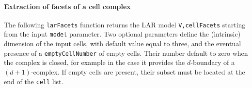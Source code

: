 \documentclass[11pt,oneside]{article}    %
\begin{document}
\paragraph{Extraction of facets of a cell complex} 

The following \texttt{larFacets} function returns the LAR model \texttt{V,cellFacets} starting from the input \texttt{model} parameter. Two optional parameters define the (intrinsic) dimension of the input cells, with default value equal to three, and the eventual presence of a \texttt{emptyCellNumber} of empty cells. Their number default to zero when the complex is closed, for example in the case it provides the $d$-boundary of a $(d+1)$-complex. If empty cells are present, their subset must be located at the end of the \texttt{cell} list.

\end{document}
